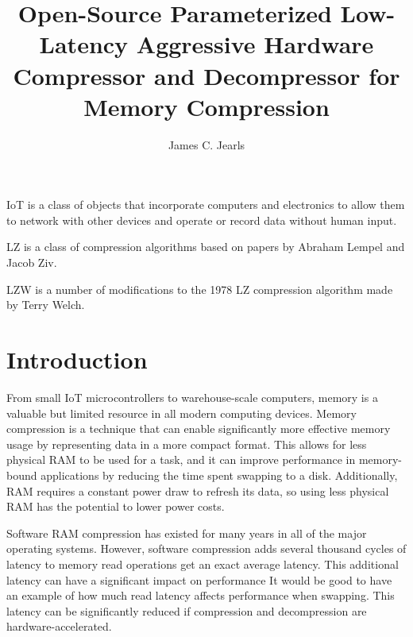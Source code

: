 \documentclass[doublespace,draft,nopageskip]{VTthesis} %
\title{Open-Source Parameterized Low-Latency Aggressive Hardware Compressor and Decompressor for Memory Compression}
\author{James C. Jearls}
\begin{document}
  \frontmatter
  \maketitle
  \tableofcontents

	\listoffigures
	\listoftables
    \printnomenclature %


IoT is a class of objects that incorporate computers and electronics to allow them to network with other devices and operate or record data without human input.


LZ is a class of compression algorithms based on papers by Abraham Lempel and Jacob Ziv.
 
 
LZW is a number of modifications to the 1978 LZ compression algorithm made by Terry Welch.
 

\mainmatter

\chapter{Introduction} \label{ch:introduction}
From small IoT microcontrollers to warehouse-scale computers, memory is a valuable but limited resource in all modern computing devices. Memory compression is a technique that can enable significantly more effective memory usage by representing data in a more compact format. This allows for less physical RAM to be used for a task, and it can improve performance in memory-bound applications by reducing the time spent swapping to a disk. Additionally, RAM requires a constant power draw to refresh its data, so using less physical RAM has the potential to lower power costs.

Software RAM compression has existed for many years in all of the major operating systems. However, software compression adds several thousand cycles of latency to memory read operations{\color{red} get an exact average latency}. This additional latency can have a significant impact on performance {\color{red} It would be good to have an example of how much read latency affects performance when swapping}. This latency can be significantly reduced if compression and decompression are hardware-accelerated.
\end{document}

